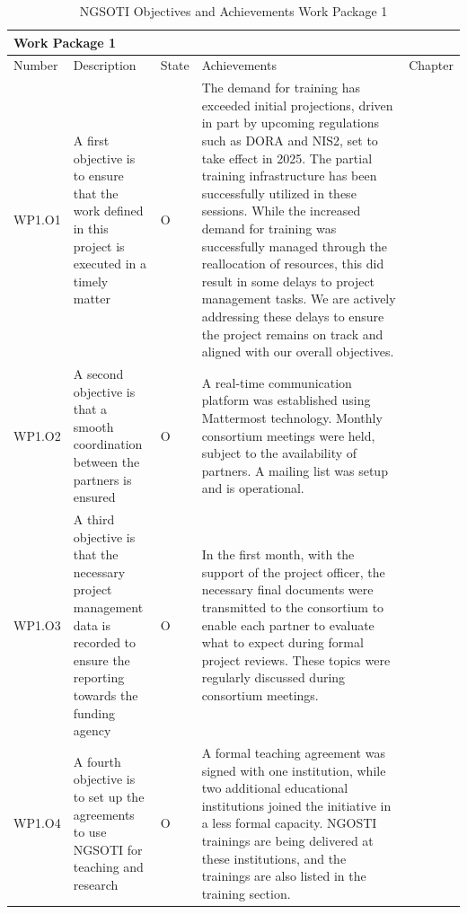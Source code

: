 \begin{table}[h]
\centering

\begin{tabular}{ |p{0.07\linewidth}  |p{0.2\linewidth}|        p{0.04\linewidth}|    p{0.62\linewidth}|  p{0.07\linewidth}|}\hline
\multicolumn{5}{|p{0.97\linewidth}|}{Work Package 1} \\
\hline
                  Number             & Description & State & Achievements & Chapter \\
\hline
WP1.O1 &
A first objective is to ensure that the work defined in this project is executed in a timely matter & O &

The demand for training has exceeded initial projections, driven in part by
upcoming regulations such as DORA and NIS2, set to take effect in 2025.
The partial training infrastructure has been successfully
utilized in these sessions. While the increased demand for training was
successfully managed through the reallocation of resources, this did result
in some delays to project management tasks. We are actively addressing these
delays to ensure the project remains on track and aligned with our overall
objectives.
&
 \\
\hline
WP1.O2 &
A second objective is that a smooth coordination between the partners is ensured
&O &
A real-time communication platform was established using Mattermost technology.
Monthly consortium meetings were held, subject to the availability of partners.
A mailing list was setup and is operational.
&
\\

\hline

WP1.O3 &
A third objective is that the necessary project management data is recorded
to ensure the reporting towards the funding
agency
& O &
In the first month, with the support of the project officer, the necessary
final documents were transmitted to the consortium to enable each partner to
evaluate what to expect during formal project reviews.
These topics were regularly discussed during consortium meetings.
&

\\

\hline

WP1.O4 &
A fourth objective is to set up the agreements to use NGSOTI for teaching
and research
& O &
A formal teaching agreement was signed with one institution, while two additional educational institutions joined the initiative in a less formal capacity. NGOSTI trainings are being delivered at these institutions, and the trainings are also listed in the training section.
&
\\

\hline
\end{tabular}
\caption{NGSOTI Objectives and Achievements Work Package 1}
\label{oa1}
\end{table}



